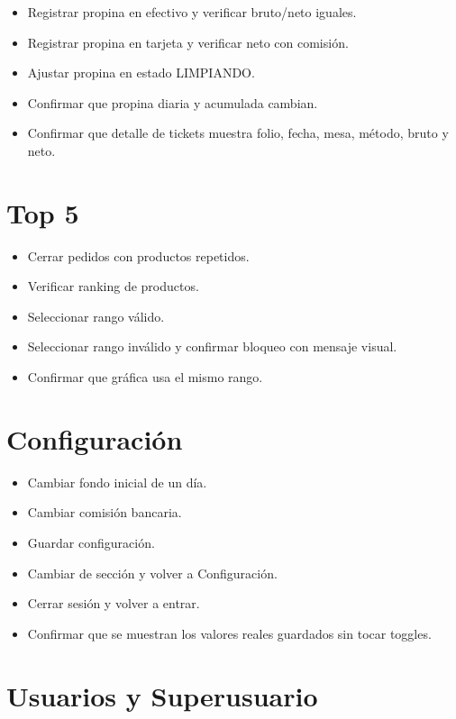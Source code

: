 \documentclass[11pt,letterpaper,openany]{report}
\begin{document}
\begin{itemize}[leftmargin=*]
  \item Registrar propina en efectivo y verificar bruto/neto iguales.
  \item Registrar propina en tarjeta y verificar neto con comisión.
  \item Ajustar propina en estado LIMPIANDO.
  \item Confirmar que propina diaria y acumulada cambian.
  \item Confirmar que detalle de tickets muestra folio, fecha, mesa, método, bruto y neto.
\end{itemize}

\section{Top 5}

\begin{itemize}[leftmargin=*]
  \item Cerrar pedidos con productos repetidos.
  \item Verificar ranking de productos.
  \item Seleccionar rango válido.
  \item Seleccionar rango inválido y confirmar bloqueo con mensaje visual.
  \item Confirmar que gráfica usa el mismo rango.
\end{itemize}

\section{Configuración}

\begin{itemize}[leftmargin=*]
  \item Cambiar fondo inicial de un día.
  \item Cambiar comisión bancaria.
  \item Guardar configuración.
  \item Cambiar de sección y volver a Configuración.
  \item Cerrar sesión y volver a entrar.
  \item Confirmar que se muestran los valores reales guardados sin tocar toggles.
\end{itemize}

\section{Usuarios y Superusuario}
\end{document}
